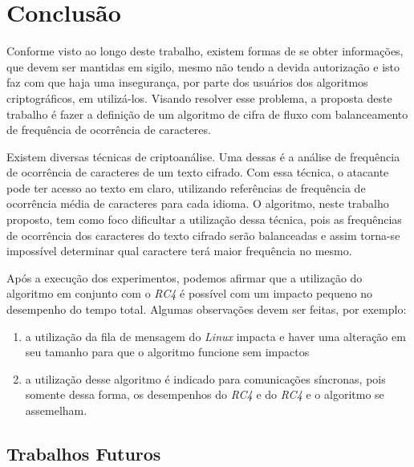 \chapter{Conclusão}
\label{conclusion}


Conforme visto ao longo deste trabalho, existem formas de se obter informações, que devem ser mantidas em sigilo, mesmo não tendo a devida autorização e isto faz com que haja uma insegurança, por parte dos usuários dos algoritmos criptográficos, em utilizá-los. Visando resolver esse problema, a proposta deste trabalho é fazer a definição de um algoritmo de cifra de fluxo com balanceamento de frequência de ocorrência de caracteres.

Existem diversas técnicas de criptoanálise. Uma dessas é a análise de frequência de ocorrência de caracteres de um texto cifrado. Com essa técnica, o atacante pode ter acesso ao texto em claro, utilizando referências de frequência de ocorrência média de caracteres para cada idioma. O algoritmo, neste trabalho proposto, tem como foco dificultar a utilização dessa técnica, pois as frequências de ocorrência dos caracteres do texto cifrado serão balanceadas e assim torna-se impossível determinar qual caractere terá maior frequência no mesmo.

Após a execução dos experimentos, podemos afirmar que a utilização do algoritmo em conjunto com o \textit{RC4} é possível com um impacto pequeno no desempenho do tempo total. Algumas observações devem ser feitas, por exemplo:

\begin{enumerate}
	\item a utilização da fila de mensagem do \textit{Linux} impacta e haver uma alteração em seu tamanho para que o algoritmo funcione sem impactos
	\item a utilização desse algoritmo é indicado para comunicações síncronas, pois somente dessa forma, os desempenhos do \textit{RC4} e do \textit{RC4} e o algoritmo se assemelham. 
\end{enumerate}

\section{Trabalhos Futuros}
\label{future-work}

